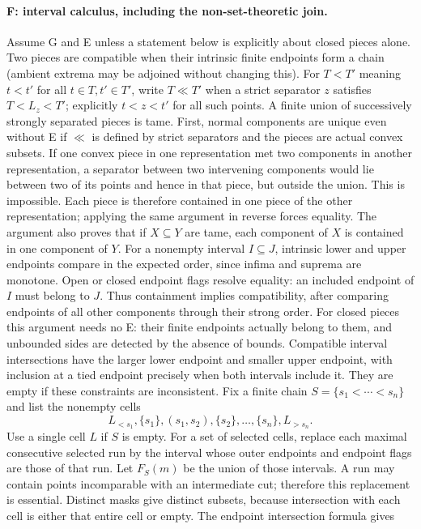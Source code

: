 \paragraph{F: interval calculus, including the non-set-theoretic join.}\label{lem:flags}
Assume G and E unless a statement below is explicitly about closed pieces alone. Two pieces are compatible when their intrinsic finite endpoints form a chain (ambient extrema may be adjoined without changing this). For $T<T'$ meaning $t<t'$ for all $t\in T,t'\in T'$, write $T\ll T'$ when a strict separator $z$ satisfies $T<L_z<T'$; explicitly $t<z<t'$ for all such points. A finite union of successively strongly separated pieces is tame.
First, normal components are unique even without E if $\ll$ is defined by strict separators and the pieces are actual convex subsets. If one convex piece in one representation met two components in another representation, a separator between two intervening components would lie between two of its points and hence in that piece, but outside the union. This is impossible. Each piece is therefore contained in one piece of the other representation; applying the same argument in reverse forces equality. The argument also proves that if $X\subseteq Y$ are tame, each component of $X$ is contained in one component of $Y$.
For a nonempty interval $I\subseteq J$, intrinsic lower and upper endpoints compare in the expected order, since infima and suprema are monotone. Open or closed endpoint flags resolve equality: an included endpoint of $I$ must belong to $J$. Thus containment implies compatibility, after comparing endpoints of all other components through their strong order. For closed pieces this argument needs no E: their finite endpoints actually belong to them, and unbounded sides are detected by the absence of bounds. Compatible interval intersections have the larger lower endpoint and smaller upper endpoint, with inclusion at a tied endpoint precisely when both intervals include it. They are empty if these constraints are inconsistent.
Fix a finite chain $S=\{s_1<\cdots<s_n\}$ and list the nonempty cells
\[
 L_{<s_1},\{s_1\},(s_1,s_2),\{s_2\},\ldots,\{s_n\},L_{>s_n}.
\]
Use a single cell $L$ if $S$ is empty. For a set of selected cells, replace each maximal consecutive selected run by the interval whose outer endpoints and endpoint flags are those of that run. Let $F_S(m)$ be the union of those intervals. A run may contain points incomparable with an intermediate cut; therefore this replacement is essential. Distinct masks give distinct subsets, because intersection with each cell is either that entire cell or empty. The endpoint intersection formula gives
